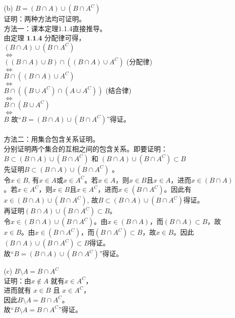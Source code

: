 \documentclass [12pt]{article}
\begin{document}
\begin{CJK*}{GBK}{kai}
\begin{enumerate}
 \item[(b)] $B=(B \cap A) \cup (B \cap A^{C})$\\
 证明：两种方法均可证明。\\
 方法一：课本定理1.1.4直接推导。\\
由$\textbf{定理 1.1.4}$ 分配律可得，\\
$(B \cap A) \cup (B \cap A^{C}) $ \\
$\Leftrightarrow$\\
 $((B \cap A) \cup B) \cap ( (B \cap A) \cup A^{C})$ (分配律)\\
 $\Leftrightarrow$\\
 $B \cap ( (B \cap A) \cup A^{C})$\\
 $\Leftrightarrow$\\
 $B \cap ( (B \cup A^{C}) \cap (A \cup A^{C}))$ (结合律)\\
 $\Leftrightarrow$\\
 $B \cap (B \cup A^{C})$ \\
 $\Leftrightarrow$\\
$B$
故“$B=(B \cap A) \cup (B \cap A^{C})$”得证。\\
\\
 方法二：用集合包含关系证明。\\
 分别证明两个集合的互相之间的包含关系。即要证明：$B \subset (B \cap A) \cup (B \cap A^{C})$ 和 $ (B \cap A) \cup (B \cap A^{C}) \subset B$\\
  先证明$B \subset (B \cap A) \cup (B \cap A^{C})$ 。\\
  令$x \in B$, 有$x \in A$或$x \in A^{C}$。若$x \in A$，则$x \in B$且$x \in A$，进而$x \in (B \cap A) $。若$x \in A^{C}$，则$x \in B$且$x \in A^{C}$，进而$x \in (B \cap A^{C}) $。因此有$x \in  (B \cap A) \cup (B \cap A^{C})$, 故$B \subset (B \cap A) \cup (B \cap A^{C})$得证。\\
  再证明$ (B \cap A) \cup (B \cap A^{C}) \subset B$。\\
  令$x \in (B \cap A) \cup (B \cap A^{C})$。由$x \in (B \cap A) $，而$(B \cap A) \subset B $，故$x \in B$。由$x \in (B \cap A^{C}) $，而$(B \cap A^{C}) \subset B $，故$x \in B$。因此$ (B \cap A) \cup (B \cap A^{C}) \subset B$得证。\\
  故“$B=(B \cap A) \cup (B \cap A^{C})$”得证。\\
   \item[(c)] $B \setminus A = B \cap A^{C}$\\
 证明：由$x \notin A$ 就有$x \in A^{C}$，\\
进而就有 $x \in B$ 且 $x \in A^{C}$，\\
 因此$B \setminus A = B \cap A^{C}$。\\
 故“$B \setminus A = B \cap A^{C}$”得证。\\


\end{enumerate}
\end{CJK*}
\end{document}
